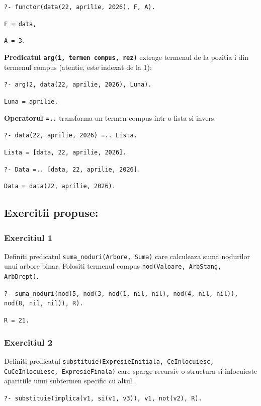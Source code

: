 \texttt{?- functor(data(22, aprilie, 2026), F, A).}

\texttt{F = data,}

\texttt{A = 3.}

\vspace{\baselineskip}

\textbf{Predicatul \texttt{arg(i, termen compus, rez)}} extrage termenul de la pozitia i din termenul
compus (atentie, este indexat de la 1):

\texttt{?- arg(2, data(22, aprilie, 2026), Luna).}

\texttt{Luna = aprilie.}

\vspace{\baselineskip}

\textbf{Operatorul \texttt{=..}} transforma un termen compus intr-o lista si invers:

\texttt{?- data(22, aprilie, 2026) =.. Lista.}

\texttt{Lista = [data, 22, aprilie, 2026].}

\texttt{?- Data =.. [data, 22, aprilie, 2026].}

\texttt{Data = data(22, aprilie, 2026).}


\subsection*{Exercitii propuse:}

\subsubsection*{Exercitiul 1}
Definiti predicatul \texttt{suma\_noduri(Arbore, Suma)} care calculeaza suma nodurilor
unui arbore binar. Folositi termenul compus \texttt{nod(Valoare, ArbStang, ArbDrept)}.

\texttt{?- suma\_noduri(nod(5, nod(3, nod(1, nil, nil), nod(4, nil, nil)), nod(8, nil, nil)), R).}

\texttt{R = 21.}

\subsubsection*{Exercitiul 2}
Definiti predicatul \texttt{substituie(ExpresieInitiala, CeInlocuiesc, CuCeInlocuiesc, ExpresieFinala)} care
sparge recursiv o structura si inlocuieste aparitiile unui subtermen specific cu altul.

\texttt{?- substituie(implica(v1, si(v1, v3)), v1, not(v2), R).}

